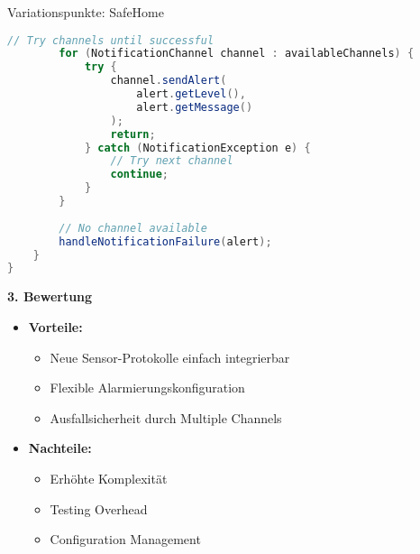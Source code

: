 \begin{example2}[breakable][breakable]{Variationspunkte: SafeHome}
\begin{lstlisting}[language=Java, style=basesmol]
        // Try channels until successful
        for (NotificationChannel channel : availableChannels) {
            try {
                channel.sendAlert(
                    alert.getLevel(), 
                    alert.getMessage()
                );
                return;
            } catch (NotificationException e) {
                // Try next channel
                continue;
            }
        }
        
        // No channel available
        handleNotificationFailure(alert);
    }
}
\end{lstlisting}

\textbf{3. Bewertung}
\begin{itemize}
    \item \textbf{Vorteile:}
    \begin{itemize}
        \item Neue Sensor-Protokolle einfach integrierbar
        \item Flexible Alarmierungskonfiguration
        \item Ausfallsicherheit durch Multiple Channels
    \end{itemize}
    
    \item \textbf{Nachteile:}
    \begin{itemize}
        \item Erhöhte Komplexität
        \item Testing Overhead
        \item Configuration Management
    \end{itemize}
\end{itemize}
\end{example2}